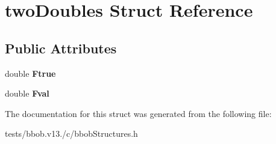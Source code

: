 \hypertarget{structtwoDoubles}{\section{two\-Doubles Struct Reference}
\label{structtwoDoubles}
}
\subsection*{Public Attributes}
\begin{DoxyCompactItemize}
\item 
\hypertarget{structtwoDoubles_aced1c18fe84fad91540f482495c9415f}{double {\bfseries Ftrue}}\label{structtwoDoubles_aced1c18fe84fad91540f482495c9415f}

\item 
\hypertarget{structtwoDoubles_aec9b0ccce9a66ff229f5549d56e6f3a2}{double {\bfseries Fval}}\label{structtwoDoubles_aec9b0ccce9a66ff229f5549d56e6f3a2}

\end{DoxyCompactItemize}


The documentation for this struct was generated from the following file\-:\begin{DoxyCompactItemize}
\item 
tests/bbob.\-v13./c/bbob\-Structures.\-h\end{DoxyCompactItemize}
